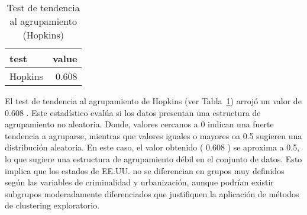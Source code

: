 \documentclass[
  spanish,
  11pt,
  a4paper,
  DIV=11,
  numbers=noendperiod]{scrartcl}
\newenvironment{Shaded}{\begin{snugshade}}{\end{snugshade}}
\newcommand{\AttributeTok}[1]{\textcolor[rgb]{0.40,0.45,0.13}{#1}}
\newcommand{\CommentTok}[1]{\textcolor[rgb]{0.37,0.37,0.37}{#1}}
\newcommand{\ConstantTok}[1]{\textcolor[rgb]{0.56,0.35,0.01}{#1}}
\newcommand{\DecValTok}[1]{\textcolor[rgb]{0.68,0.00,0.00}{#1}}
\newcommand{\FunctionTok}[1]{\textcolor[rgb]{0.28,0.35,0.67}{#1}}
\newcommand{\NormalTok}[1]{\textcolor[rgb]{0.00,0.23,0.31}{#1}}
\newcommand{\OtherTok}[1]{\textcolor[rgb]{0.00,0.23,0.31}{#1}}
\newcommand{\SpecialCharTok}[1]{\textcolor[rgb]{0.37,0.37,0.37}{#1}}
\newcommand{\StringTok}[1]{\textcolor[rgb]{0.13,0.47,0.30}{#1}}
\begin{document}
\begin{Shaded}
\end{Shaded}

\begin{longtable}[]{@{}lr@{}}

\caption{\label{tbl-clust-hopkins}Test de tendencia al agrupamiento
(Hopkins)}

\tabularnewline

\toprule\noalign{}
test & value \\
\midrule\noalign{}
\endhead
\bottomrule\noalign{}
\endlastfoot
Hopkins & 0.608 \\

\end{longtable}

El test de tendencia al agrupamiento de Hopkins (ver
Tabla~\ref{tbl-clust-hopkins}) arrojó un valor de 0.608 . Este
estadístico evalúa si los datos presentan una estructura de agrupamiento
no aleatoria. Donde, valores cercanos a 0 indican una fuerte tendencia a
agruparse, mientras que valores iguales o mayores oa 0.5 sugieren una
distribución aleatoria. En este caso, el valor obtenido ( 0.608 ) se
aproxima a 0.5, lo que sugiere una estructura de agrupamiento débil en
el conjunto de datos. Esto implica que los estados de EE.UU. no se
diferencian en grupos muy definidos según las variables de criminalidad
y urbanización, aunque podrían existir subgrupos moderadamente
diferenciados que justifiquen la aplicación de métodos de clustering
exploratorio.
\end{document}
